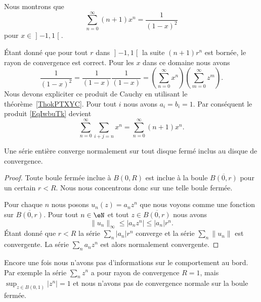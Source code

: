 \begin{example}
    Nous montrons que
    \begin{equation}
        \sum_{n=0}^{\infty}(n+1)x^n=\frac{1}{ (1-x)^2 }
    \end{equation}
    pour \( x\in\mathopen] -1 , 1 \mathclose[\).

    Étant donné que pour tout \( r\) dans \( \mathopen] -1 , 1 \mathclose[\) la suite \( (n+1)r^n\) est bornée, le rayon de convergence est correct. Pour les \( x\) dans ce domaine nous avons
    \begin{equation}        \label{EqIwbuTk}
        \frac{1}{ (1-x)^2 }=\frac{1}{ (1-x) }\frac{1}{ (1-x) }=\left( \sum_{n=0}^{\infty}x^n \right)\left( \sum_{m=0}^{\infty}z^m \right).
    \end{equation}
    Nous devons expliciter ce produit de Cauchy en utilisant le théorème~\ref{ThokPTXYC}. Pour tout \( i\) nous avons \( a_i=b_i=1\). Par conséquent le produit \eqref{EqIwbuTk} devient
    \begin{equation}
        \sum_{n=0}^{\infty}\sum_{i+j=n}x^n=\sum_{n=0}^{\infty}(n+1)x^n.
    \end{equation}
\end{example}

\begin{theorem}
    Une série entière converge normalement sur tout disque fermé inclus au disque de convergence.
\end{theorem}

\begin{proof}
    Toute boule fermée inclue à \( B(0,R)\) est inclue à la boule \( \overline{ B(0,r) }\) pour un certain \( r<R\). Nous nous concentrons donc sur une telle boule fermée.

    Pour chaque \( n\) nous posons \( u_n(z)=a_nz^n\) que nous voyons comme une fonction sur \( \overline{ B(0,r) }\). Pour tout \( n\in \eN\) et tout \( z\in\overline{ B(0,r) }\) nous avons
    \begin{equation}
        \| u_n \|_{\infty}\leq| a_nz^n |\leq | a_n |r^n.
    \end{equation}
    Étant donné que \( r<R\) la série \( \sum_n | a_n |r^n\) converge et la série \( \sum_n\| u_n \|\) est convergente. La série \( \sum_na_nz^n\) est alors normalement convergente.
\end{proof}

\begin{example}
    Encore une fois nous n'avons pas d'informations sur le comportement au bord. Par exemple la série \( \sum_nz^n\) a pour rayon de convergence \( R=1\), mais \( \sup_{z\in B(0,1)}| z^n |=1\) et nous n'avons pas de convergence normale sur la boule fermée.
\end{example}

